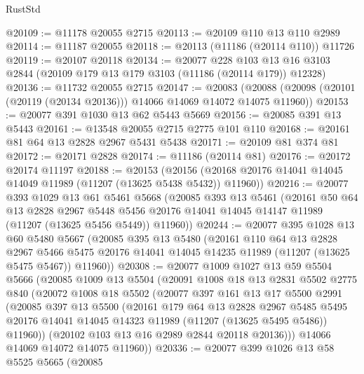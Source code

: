 \begin{lexlean}{RustStd}
\begin{coremodule}
@20109 := @11178 @20055 @2715
@20113 := @20109 @110 @13 @110 @2989
@20114 := @11187 @20055
@20118 := @20113 (@11186 (@20114 @110)) @11726
@20119 := @20107 @20118
@20134 := @20077
    @228
    @103
    @13
    @16
    @3103
    @2844
    (@20109 @179 @13 @179 @3103 (@11186 (@20114 @179)) @12328)
@20136 := @11732 @20055 @2715
@20147 := @20083
    (@20088 (@20098 (@20101 (@20119 (@20134 @20136))) @14066 @14069 @14072 @14075 @11960))
@20153 := @20077 @391 @1030 @13 @62 @5443 @5669
@20156 := @20085 @391 @13 @5443
@20161 := @13548 @20055 @2715 @2775 @101 @110
@20168 := @20161 @81 @64 @13 @2828 @2967 @5431 @5438
@20171 := @20109 @81 @374 @81
@20172 := @20171 @2828
@20174 := @11186 (@20114 @81)
@20176 := @20172 @20174 @11197
@20188 := @20153
    (@20156 (@20168 @20176 @14041 @14045 @14049 @11989 (@11207 (@13625 @5438 @5432)) @11960))
@20216 := @20077
    @393
    @1029
    @13
    @61
    @5461
    @5668
    (@20085
      @393
      @13
      @5461
      (@20161
        @50
        @64
        @13
        @2828
        @2967
        @5448
        @5456
        @20176
        @14041
        @14045
        @14147
        @11989
        (@11207 (@13625 @5456 @5449))
        @11960))
@20244 := @20077
    @395
    @1028
    @13
    @60
    @5480
    @5667
    (@20085
      @395
      @13
      @5480
      (@20161
        @110
        @64
        @13
        @2828
        @2967
        @5466
        @5475
        @20176
        @14041
        @14045
        @14235
        @11989
        (@11207 (@13625 @5475 @5467))
        @11960))
@20308 := @20077
    @1009
    @1027
    @13
    @59
    @5504
    @5666
    (@20085
      @1009
      @13
      @5504
      (@20091
        @1008
        @18
        @13
        @2831
        @5502
        @2775
        @840
        (@20072
          @1008
          @18
          @5502
          (@20077
            @397
            @161
            @13
            @17
            @5500
            @2991
            (@20085
              @397
              @13
              @5500
              (@20161
                @179
                @64
                @13
                @2828
                @2967
                @5485
                @5495
                @20176
                @14041
                @14045
                @14323
                @11989
                (@11207 (@13625 @5495 @5486))
                @11960))
            (@20102 @103 @13 @16 @2989 @2844 @20118 @20136)))
        @14066
        @14069
        @14072
        @14075
        @11960))
@20336 := @20077
    @399
    @1026
    @13
    @58
    @5525
    @5665
    (@20085

\end{coremodule}
\end{lexlean}
